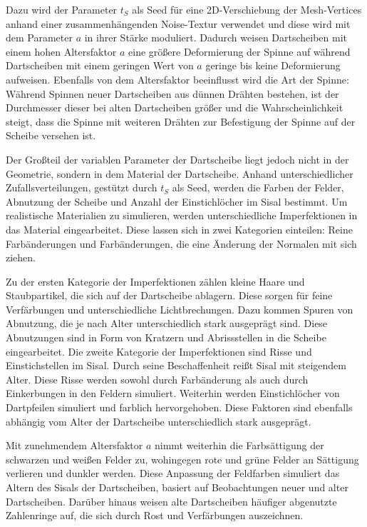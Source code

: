 Dazu wird der Parameter $t_S$ als Seed für eine 2D-Verschiebung der Mesh-Vertices anhand einer zusammenhängenden Noise-Textur verwendet und diese wird mit dem Parameter $a$ in ihrer Stärke moduliert. Dadurch weisen Dartscheiben mit einem hohen Altersfaktor $a$ eine größere Deformierung der Spinne auf während Dartscheiben mit einem geringen Wert von $a$ geringe bis keine Deformierung aufweisen. Ebenfalls von dem Altersfaktor beeinflusst wird die Art der Spinne: Während Spinnen neuer Dartscheiben aus dünnen Drähten bestehen, ist der Durchmesser dieser bei alten Dartscheiben größer und die Wahrscheinlichkeit steigt, dass die Spinne mit weiteren Drähten zur Befestigung der Spinne auf der Scheibe versehen ist.

Der Großteil der variablen Parameter der Dartscheibe liegt jedoch nicht in der Geometrie, sondern in dem Material der Dartscheibe. Anhand unterschiedlicher Zufallsverteilungen, gestützt durch $t_S$ als Seed, werden die Farben der Felder, Abnutzung der Scheibe und Anzahl der Einstichlöcher im Sisal bestimmt.
Um realistische Materialien zu simulieren, werden unterschiedliche Imperfektionen in das Material eingearbeitet. Diese lassen sich in zwei Kategorien einteilen: Reine Farbänderungen und Farbänderungen, die eine Änderung der Normalen mit sich ziehen.

Zu der ersten Kategorie der Imperfektionen zählen kleine Haare und Staubpartikel, die sich auf der Dartscheibe ablagern. Diese sorgen für feine Verfärbungen und unterschiedliche Lichtbrechungen. Dazu kommen Spuren von Abnutzung, die je nach Alter unterschiedlich stark ausgeprägt sind. Diese Abnutzungen sind in Form von Kratzern und Abrissstellen in die Scheibe eingearbeitet.
Die zweite Kategorie der Imperfektionen sind Risse und Einstichstellen im Sisal. Durch seine Beschaffenheit reißt Sisal mit steigendem Alter. Diese Risse werden sowohl durch Farbänderung als auch durch Einkerbungen in den Feldern simuliert. Weiterhin werden Einstichlöcher von Dartpfeilen simuliert und farblich hervorgehoben. Diese Faktoren sind ebenfalls abhängig vom Alter der Dartscheibe unterschiedlich stark ausgeprägt.

Mit zunehmendem Altersfaktor $a$ nimmt weiterhin die Farbsättigung der schwarzen und weißen Felder zu, wohingegen rote und grüne Felder an Sättigung verlieren und dunkler werden. Diese Anpassung der Feldfarben simuliert das Altern des Sisals der Dartscheiben, basiert auf Beobachtungen neuer und alter Dartscheiben. Darüber hinaus weisen alte Dartscheiben häufiger abgenutzte Zahlenringe auf, die sich durch Rost und Verfärbungen auszeichnen.



